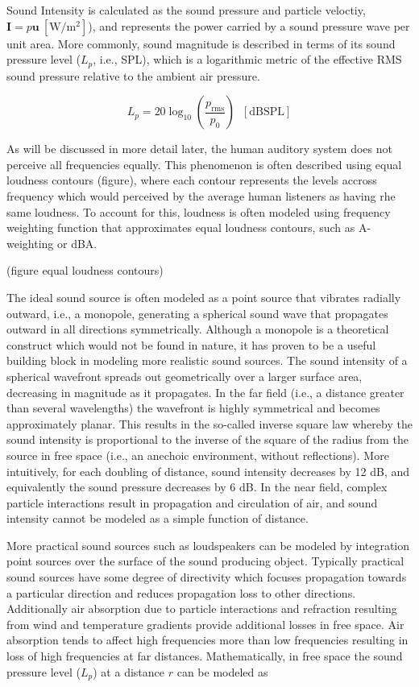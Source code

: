 Sound Intensity is calculated as the sound pressure and particle veloctiy, $\mathbf{I}=p\mathbf{u} \:[\unit{\watt\per\metre\squared}]$), and represents the power carried by a sound pressure wave per unit area. More commonly, sound magnitude is described in terms of its sound pressure level ($L_p$, i.e., SPL), which is a logarithmic metric of the effective RMS sound pressure relative to the ambient air pressure.

\[L_p=20\log_{10}\left(\frac{p_\mathrm{rms}}{p_0}\right)\;\;[\mathrm{dBSPL}]\]

As will be discussed in more detail later, the human auditory system does not perceive all frequencies equally. This phenomenon is often described using equal loudness contours (figure), where each contour represents the levels accross frequency which would perceived by the average human listeners as having rhe same loudness. To account for this, loudness is often modeled using frequency weighting function that approximates equal loudness contours, such as A-weighting or dBA.

(figure equal loudness contours)

The ideal sound source is often modeled as a point source that vibrates radially outward, i.e., a monopole, generating a spherical sound wave that propagates outward in all directions symmetrically. Although a monopole is a theoretical construct which would not be found in nature, it has proven to be a useful building block in modeling more realistic sound sources. The sound intensity of a spherical wavefront spreads out geometrically over a larger surface area, decreasing in magnitude as it propagates. In the far field (i.e., a distance greater than several wavelengths) the wavefront is highly symmetrical and becomes approximately planar. This results in the so-called inverse square law whereby the sound intensity is proportional to the inverse of the square of the radius from the source in free space (i.e., an anechoic environment, without reflections). More intuitively, for each doubling of distance, sound intensity decreases by 12 dB, and equivalently the sound pressure decreases by 6 dB. In the near field, complex particle interactions result in propagation and circulation of air, and sound intensity cannot be modeled as a simple function of distance.

More practical sound sources such as loudspeakers can be modeled by integration point sources over the surface of the sound producing object. Typically practical sound sources have some degree of directivity which focuses propagation towards a particular direction and reduces propagation loss to other directions. Additionally air absorption due to particle interactions and refraction resulting from wind and temperature gradients provide additional losses in free space. Air absorption tends to affect high frequencies more than low frequencies resulting in loss of high frequencies at far distances. Mathematically, in free space the sound pressure level ($L_p$) at a distance $r$ can be modeled as


